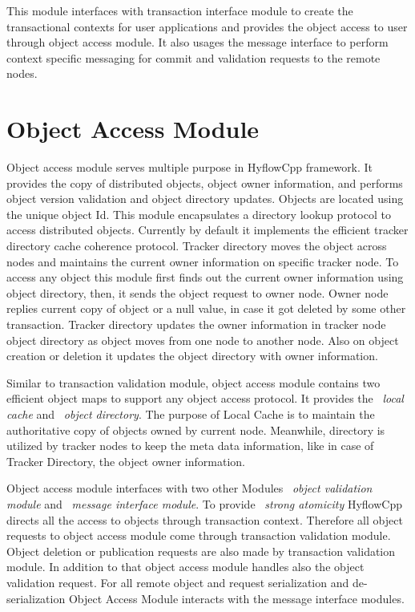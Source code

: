 \documentclass[12pt,english]{report}
\begin{document}
This module interfaces with transaction interface module to create the transactional contexts for user applications and provides the object access to user through object access module. It also usages the message interface to perform context specific messaging for commit and validation requests to the remote nodes.

\section{Object Access Module}

Object access module serves multiple purpose in HyflowCpp framework. It provides the copy of distributed objects, object owner information, and performs object version validation and object directory updates. Objects are located using the unique object Id. This module encapsulates a directory lookup protocol to access distributed objects. Currently by default it implements the efficient tracker directory cache coherence protocol. Tracker directory moves the object across nodes and maintains the current owner information on specific tracker node. To access any object this module first finds out the current owner information using object directory, then, it sends the object request to owner node. Owner node replies current copy of object or a null value, in case it got deleted by some other transaction. Tracker directory updates the owner information in tracker node object directory as object moves from one node to another node. Also on object creation or deletion it updates the object directory with owner information. 

Similar to transaction validation module, object access module contains two efficient object maps to support any object access protocol. It provides the ~\emph{local cache} and ~\emph{object directory}. The purpose of Local Cache is to maintain the authoritative copy of objects owned by current node. Meanwhile, directory is utilized by tracker nodes to keep the meta data information, like in case of Tracker Directory, the object owner information. 

Object access module interfaces with two other Modules ~\emph{object validation module} and ~\emph{message interface module}. To provide ~\emph{strong atomicity} HyflowCpp directs all the access to objects through transaction context. Therefore all object requests to object access module come through transaction validation module. Object deletion or publication requests are also made by transaction validation module. In addition to that object access module handles also the object validation request. For all remote object and request serialization and de-serialization Object Access Module interacts with the message interface modules.
\end{document}

